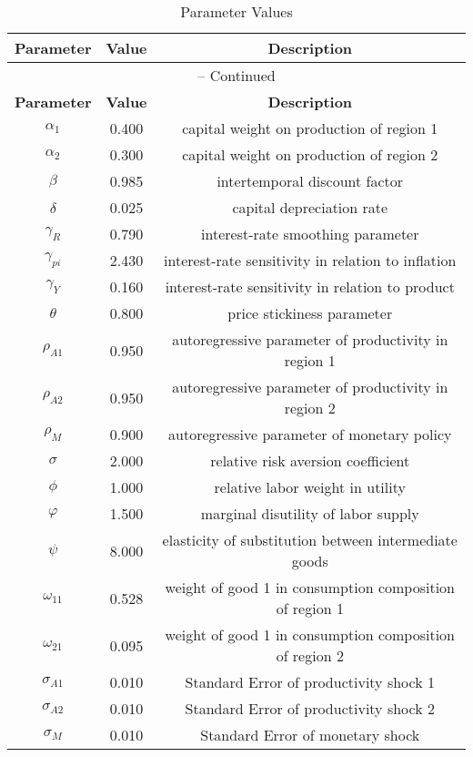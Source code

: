 \begin{center}
\begin{longtable}{ccc}
\caption{Parameter Values}\\%
\toprule%
\multicolumn{1}{c}{\textbf{Parameter}} &
\multicolumn{1}{c}{\textbf{Value}} &
 \multicolumn{1}{c}{\textbf{Description}}\\%
\midrule%
\endfirsthead
\multicolumn{3}{c}{{\tablename} \thetable{} -- Continued}\\%
\midrule%
\multicolumn{1}{c}{\textbf{Parameter}} &
\multicolumn{1}{c}{\textbf{Value}} &
  \multicolumn{1}{c}{\textbf{Description}}\\%
\midrule%
\endhead
${\alpha_{1}}$ 	 & 	 0.400 	 & 	 capital weight on production of region 1\\
${\alpha_{2}}$ 	 & 	 0.300 	 & 	 capital weight on production of region 2\\
${\beta}$ 	 & 	 0.985 	 & 	 intertemporal discount factor\\
${\delta}$ 	 & 	 0.025 	 & 	 capital depreciation rate\\
${\gamma_{R}}$ 	 & 	 0.790 	 & 	 interest-rate smoothing parameter\\
${\gamma_{pi}}$ 	 & 	 2.430 	 & 	 interest-rate sensitivity in relation to inflation\\
${\gamma_{Y}}$ 	 & 	 0.160 	 & 	 interest-rate sensitivity in relation to product\\
${\theta}$ 	 & 	 0.800 	 & 	 price stickiness parameter\\
${\rho_{A1}}$ 	 & 	 0.950 	 & 	 autoregressive parameter of productivity in region 1\\
${\rho_{A2}}$ 	 & 	 0.950 	 & 	 autoregressive parameter of productivity in region 2\\
${\rho_{M}}$ 	 & 	 0.900 	 & 	 autoregressive parameter of monetary policy\\
${\sigma}$ 	 & 	 2.000 	 & 	 relative risk aversion coefficient\\
${\phi}$ 	 & 	 1.000 	 & 	 relative labor weight in utility\\
${\varphi}$ 	 & 	 1.500 	 & 	 marginal disutility of labor supply\\
${\psi}$ 	 & 	 8.000 	 & 	 elasticity of substitution between intermediate goods\\
${\omega_{11}}$ 	 & 	 0.528 	 & 	 weight of good 1 in consumption composition of region 1\\
${\omega_{21}}$ 	 & 	 0.095 	 & 	 weight of good 1 in consumption composition of region 2\\
${\sigma_{A1}}$ 	 & 	 0.010 	 & 	 Standard Error of productivity shock 1\\
${\sigma_{A2}}$ 	 & 	 0.010 	 & 	 Standard Error of productivity shock 2\\
${\sigma_M}$ 	 & 	 0.010 	 & 	 Standard Error of monetary shock\\
\bottomrule%
\end{longtable}
\end{center}
